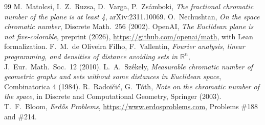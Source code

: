 \documentclass[11pt]{amsart}
\theoremstyle{definition}
\newcommand{\R}{\mathbb{R}}
\begin{document}
\begin{thebibliography}{99}
 M.~Matolcsi, I.~Z.~Ruzsa, D.~Varga, P.~Zs\'amboki, \emph{The fractional chromatic number of the plane is at least 4}, arXiv:2311.10069.
 O.~Nechushtan, \emph{On the space chromatic number}, Discrete Math.\ 256 (2002).
 OpenAI, \emph{The Euclidean plane is not five-colorable}, preprint (2026), \url{https://github.com/openai/math}, with Lean formalization.
 F.~M.~de Oliveira Filho, F.~Vallentin, \emph{Fourier analysis, linear programming, and densities of distance avoiding sets in $\R^n$}, J.\ Eur.\ Math.\ Soc.\ 12 (2010).
 L.~A.~Sz\'ekely, \emph{Measurable chromatic number of geometric graphs and sets without some distances in Euclidean space}, Combinatorica 4 (1984).
 R.~Radoi\v{c}i\'c, G.~T\'oth, \emph{Note on the chromatic number of the space}, in Discrete and Computational Geometry, Springer (2003).
 T.~F.~Bloom, \emph{Erd\H{o}s Problems}, \url{https://www.erdosproblems.com}, Problems \#188 and \#214.
\end{thebibliography}
\end{document}

